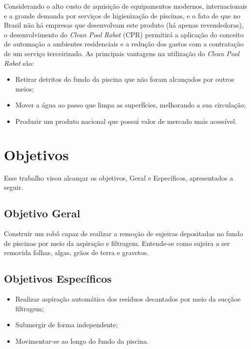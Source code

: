 Considerando o alto custo de aquisição de equipamentos modernos, internacionais
e a grande demanda por serviços de higienização de piscinas, e o fato de que
no Brasil não há empresas que desenvolvam este produto (há apenas revendedoras),
o desenvolvimento do \textit{Clean Pool Robot} (\textsf{CPR}) permitirá a
aplicação do conceito de automação a ambientes residenciais e a redução dos
gastos com a contratação de um serviço terceirizado. As principais vantagens
na utilização do \textit{Clean Pool Robot} são:

\begin{itemize}
\item Retirar detritos do fundo da piscina que não foram alcançados por outros
meios;
\item Mover a água ao passo que limpa as superfícies, melhorando a sua circulação;
\item Produzir um produto nacional que possui valor de mercado mais acessível.
\end{itemize}

\section{Objetivos}
Esse trabalho visou alcançar os objetivos, Geral e Específicos, apresentados a seguir.

\subsection{Objetivo Geral}
Construir um robô capaz de realizar a remoção de sujeiras depositadas no fundo
de piscinas por meio da aspiração e filtragem. Entende-se como sujeira a ser
removida folhas, algas, grãos de terra e gravetos.

\subsection{Objetivos Específicos}
\begin{itemize}
\item Realizar aspiração automática dos resíduos decantados por meio da sucçãoe filtragem;
\item Submergir de forma independente;
\item Movimentar-se ao longo do fundo da piscina.
\end{itemize}